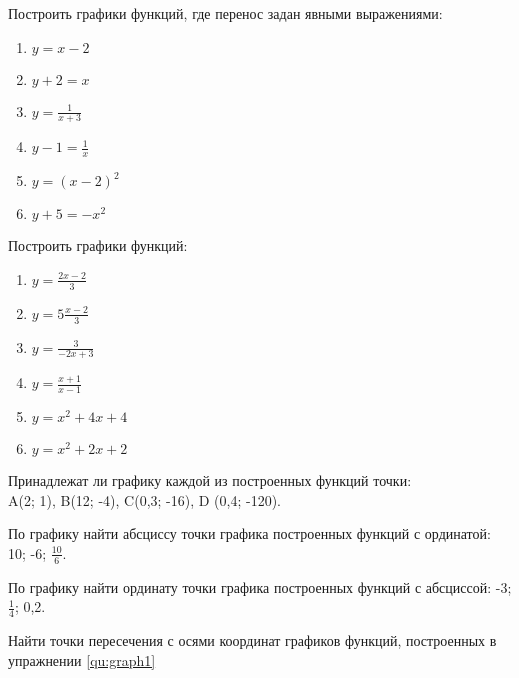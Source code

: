 \documentclass[algebra,twocolumn]{pum}
\begin{document}
  \begin{exercises}
    \begin{question}
      \label{qu:graph1}
      Построить графики функций, где перенос задан явными выражениями:
      \begin{multicols}{2}
        \begin{enumerate}[label=\arabic*)]
        \item $y=x-2$ 
        \item $y+2=x$ 
        \item $y=\frac{1}{x+3}$ 
        \item $y-1=\frac{1}{x}$ 
        \item $y=(x-2)^2$ 
        \item $y+5=-x^2$ 
      \end{enumerate}
    \end{multicols}
  \end{question}
    \begin{question}
      \label{qu:graph2}
      Построить графики функций:
      \begin{multicols}{2}
        \begin{enumerate}[label=\arabic*)]
        \item $y=\frac{2x-2}{3}$ 
        \item $y=5\frac{x-2}{3}$ 
        \item $y=\frac{3}{-2x+3}$ 
        \item $y=\frac{x+1}{x-1}$ 
        \item $y=x^2+4x+4$ 
        \item $y=x^2+2x+2$ 
      \end{enumerate}
    \end{multicols}
  \end{question}
  \begin{question}
    Принадлежат ли графику каждой из построенных функций точки:\\
    A(2; 1), B(12; -4), C(0,3; -16), D (0,4; -120).
  \end{question}
  \begin{question}
    По графику найти абсциссу точки графика построенных функций с ординатой: 10; -6; $\frac{10}{6}$.
  \end{question}
  \begin{question}
    По графику найти ординату точки графика построенных функций с абсциссой: -3; $\frac{1}{4}$; 0,2.
  \end{question}
  \begin{question}
    Найти точки пересечения с осями координат графиков функций, построенных в упражнении \ref{qu:graph1} 

\end{question}
\end{exercises}
\end{document}
